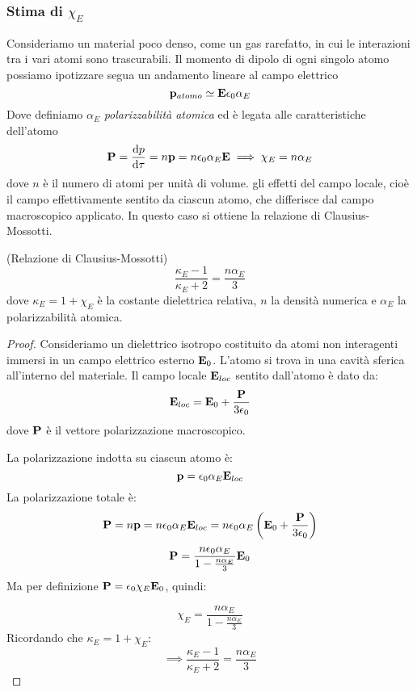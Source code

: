 \documentclass[12pt,a4paper]{article}
\begin{document}
\subsubsection[Stima di chi]{Stima di $\chi_E$}
Consideriamo un material poco denso, come un gas rarefatto, in cui le interazioni tra i vari atomi sono trascurabili. 
Il momento di dipolo di ogni singolo atomo possiamo ipotizzare segua un andamento lineare al campo elettrico
\begin{equation*}
    \vb{p}_{atomo}\simeq\vb{E}\epsilon_0\alpha_E
\end{equation*}
Dove definiamo $\alpha_E$ \textit{polarizzabilità atomica} ed è legata alle caratteristiche dell'atomo
\begin{equation*}
    \vb{P}= \frac{\dd{p}}{\dd{\tau}}= n\vb{p}= n\epsilon_0\alpha_E\vb{E}\implies \chi_E = n\alpha_E 
\end{equation*}
dove $n$ è il numero di atomi per unità di volume.
gli effetti del campo locale, cioè il campo effettivamente sentito da ciascun atomo, che differisce dal campo macroscopico applicato. In questo caso si ottiene la relazione di Clausius-Mossotti.

\begin{proposition}
(Relazione di Clausius-Mossotti)
\[
\frac{\kappa_E - 1}{\kappa_E + 2} = \frac{n \alpha_E}{3}
\]
dove $\kappa_E = 1 + \chi_E$ è la costante dielettrica relativa, $n$ la densità numerica e $\alpha_E$ la polarizzabilità atomica.
\end{proposition}
\begin{proof}
Consideriamo un dielettrico isotropo costituito da atomi non interagenti immersi in un campo elettrico esterno $\vb{E}_0$. 
L'atomo si trova in una cavità sferica all'interno del materiale. Il campo locale $\vb{E}_{loc}$ sentito dall'atomo è dato da:
\[
\vb{E}_{loc} = \vb{E}_0 + \frac{\vb{P}}{3\epsilon_0}
\]
dove $\vb{P}$ è il vettore polarizzazione macroscopico.

La polarizzazione indotta su ciascun atomo è:
\[
\vb{p} = \epsilon_0 \alpha_E \vb{E}_{loc}
\]
La polarizzazione totale è:
\[
\vb{P} = n \vb{p} = n \epsilon_0 \alpha_E \vb{E}_{loc}
= n \epsilon_0 \alpha_E \left( \vb{E}_0 + \frac{\vb{P}}{3\epsilon_0} \right)
\]
\[
\vb{P} = \frac{n \epsilon_0 \alpha_E}{1 - \frac{n \alpha_E}{3}} \vb{E}_0
\]
Ma per definizione $\vb{P} = \epsilon_0 \chi_E \vb{E}_0$, quindi:

\[
\chi_E = \frac{n \alpha_E}{1 - \frac{n \alpha_E}{3}}
\]
Ricordando che $\kappa_E = 1 + \chi_E$:
\[
\implies \frac{\kappa_E - 1}{\kappa_E + 2} = \frac{n \alpha_E}{3}
\]
\end{proof}
\end{document}
